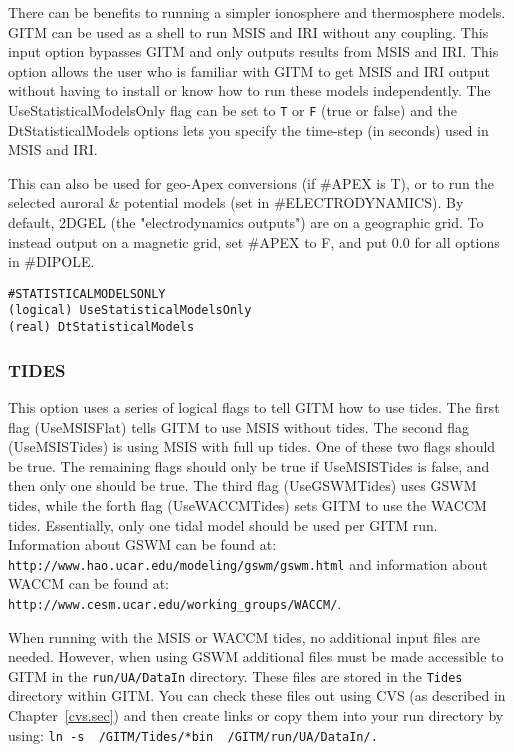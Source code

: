 There can be benefits to running a simpler ionosphere and thermosphere models.  GITM can be used as a shell to run MSIS and IRI without any coupling.  This input option bypasses GITM and only outputs results from MSIS and IRI.  This option allows the user who is familiar with GITM to get MSIS and IRI output without having to install or know how to run these models independently.  The UseStatisticalModelsOnly flag can be set to {\tt T} or {\tt F} (true or false) and the DtStatisticalModels options lets you specify the time-step (in seconds) used in MSIS and IRI.

This can also be used for geo-Apex conversions (if \#APEX is T), or to run the selected auroral \& potential models (set in \#ELECTRODYNAMICS). By default, 2DGEL (the "electrodynamics outputs") are on a geographic grid. To instead output on a magnetic grid, set \#APEX to F, and put 0.0 for all options in \#DIPOLE.

\begin{verbatim}
#STATISTICALMODELSONLY
(logical) UseStatisticalModelsOnly
(real) DtStatisticalModels
\end{verbatim}

\subsubsection{TIDES}
\label{tides}

This option uses a series of logical flags to tell GITM how to use tides.   The first flag (UseMSISFlat) tells GITM to use MSIS without tides.  The second flag (UseMSISTides) is using MSIS with full up tides. One of these two flags should be true.  The remaining flags should only be true if UseMSISTides is false, and then only one should be true.  The third flag (UseGSWMTides) uses GSWM tides, while the forth flag (UseWACCMTides) sets GITM to use the WACCM tides.  Essentially, only one tidal model should be used per GITM run.  Information about GSWM can be found at: \\{\tt http://www.hao.ucar.edu/modeling/gswm/gswm.html} and information about WACCM can be found at: \\{\tt http://www.cesm.ucar.edu/working\_groups/WACCM/}.

When running with the MSIS or WACCM tides, no additional input files are needed.  However, when using GSWM additional files must be made accessible to GITM in the {\tt run/UA/DataIn} directory.  These files are stored in the {\tt Tides} directory within GITM.  You can check these files out using CVS (as described in Chapter~\ref{cvs.sec}) and then create links or copy them into your run directory by using: {\tt ln -s ~/GITM/Tides/*bin ~/GITM/run/UA/DataIn/.}

